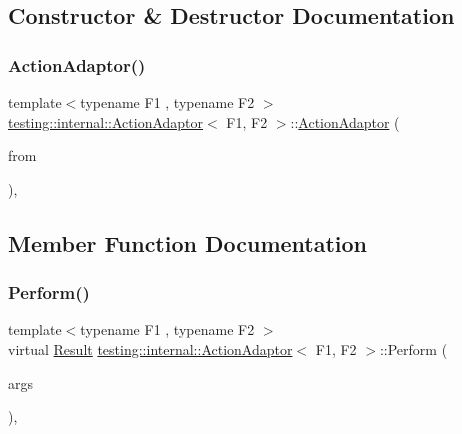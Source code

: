 \subsection{Constructor \& Destructor Documentation}
\mbox{\label{classtesting_1_1internal_1_1ActionAdaptor_a24ba3330ef3cc365b956c50ec73e4177}} 
\subsubsection{\texorpdfstring{ActionAdaptor()}{ActionAdaptor()}}
{\footnotesize\ttfamily template$<$typename F1 , typename F2 $>$ \\
\mbox{\hyperlink{classtesting_1_1internal_1_1ActionAdaptor}{testing\+::internal\+::\+Action\+Adaptor}}$<$ F1, F2 $>$\+::\mbox{\hyperlink{classtesting_1_1internal_1_1ActionAdaptor}{Action\+Adaptor}} (\begin{DoxyParamCaption}\item[{const \mbox{\hyperlink{classtesting_1_1Action}{Action}}$<$ F2 $>$ \&}]{from }\end{DoxyParamCaption})\hspace{0.3cm}{\ttfamily [inline]}, {\ttfamily [explicit]}}



\subsection{Member Function Documentation}
\mbox{\label{classtesting_1_1internal_1_1ActionAdaptor_a8d8a47a31f068cf6e0c95b91605d5540}} 
\subsubsection{\texorpdfstring{Perform()}{Perform()}}
{\footnotesize\ttfamily template$<$typename F1 , typename F2 $>$ \\
virtual \mbox{\hyperlink{classtesting_1_1internal_1_1ActionAdaptor_afa8f7872b6db3d8f1545fd98b45b0b95}{Result}} \mbox{\hyperlink{classtesting_1_1internal_1_1ActionAdaptor}{testing\+::internal\+::\+Action\+Adaptor}}$<$ F1, F2 $>$\+::Perform (\begin{DoxyParamCaption}\item[{const \mbox{\hyperlink{classtesting_1_1internal_1_1ActionAdaptor_a4f78fb73f97b72fea8a93b78a8ab5704}{Argument\+Tuple}} \&}]{args }\end{DoxyParamCaption})\hspace{0.3cm}{\ttfamily [inline]}, {\ttfamily [virtual]}}



